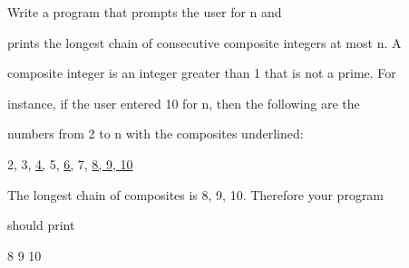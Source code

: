 Write a program that prompts the user for n and

prints the longest chain of consecutive composite integers at most n. A

composite integer is an integer greater than 1 that is not a prime. For

instance, if the user entered 10 for n, then the following are the

numbers from 2 to n with the composites underlined:

\begin{center}

2, 3, \underline{4,} 5, \underline{6,} 7, \underline{8, 9, 10}

\end{center}

The longest chain of composites is 8, 9, 10. Therefore your program

should print

\begin{console}

8 9 10

\end{console}

